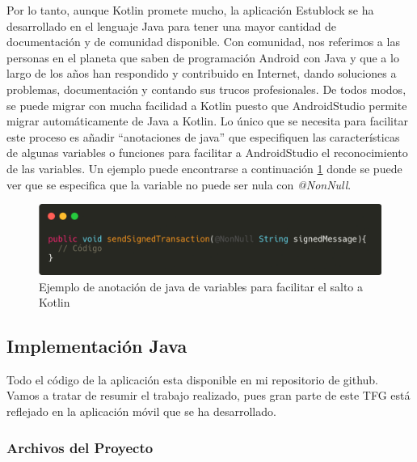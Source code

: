 Por lo tanto, aunque Kotlin promete mucho, la aplicación Estublock se ha desarrollado en el lenguaje Java para tener una mayor cantidad de documentación y de comunidad disponible. Con comunidad, nos referimos a las personas en el planeta que saben de programación Android con Java y que a lo largo de los años han respondido y contribuido en Internet, dando soluciones a problemas, documentación y contando sus trucos profesionales. De todos modos, se puede migrar con mucha facilidad a Kotlin puesto que AndroidStudio permite migrar automáticamente de Java a Kotlin. Lo único que se necesita para facilitar este proceso es añadir ``anotaciones de java'' que especifiquen las características de algunas variables o funciones para facilitar a AndroidStudio el reconocimiento de las variables. Un ejemplo puede encontrarse a continuación \ref{fig:nonNull} donde se puede ver que se especifica que la variable no puede ser nula con \emph{@NonNull}.


\begin{figure}[h!]
  \centering
  \includegraphics[width=0.9\linewidth]{figs/Desarrollo/nonNull}
  \caption[Facilitar el salto a Kotlin]{Ejemplo de anotación de java de variables para facilitar el salto a Kotlin}
  \label{fig:nonNull}
\end{figure}


\subsection{Implementación Java}

Todo el código de la aplicación esta disponible en mi repositorio de github\cite{forgis98}. Vamos a tratar de resumir el trabajo realizado, pues gran parte de este TFG está reflejado en la aplicación móvil que se ha desarrollado.

\subsubsection{Archivos del Proyecto}

